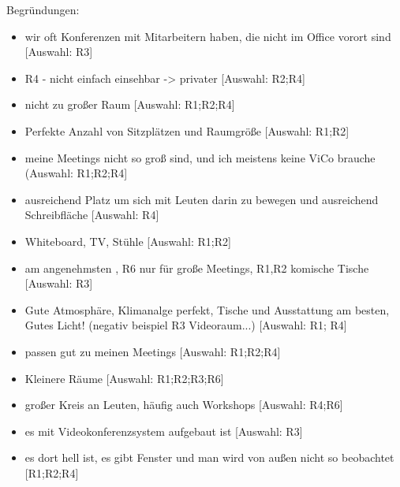 \begin{enumerate}
    Begründungen:
    \begin{itemize}
        \item wir oft Konferenzen mit Mitarbeitern haben, die nicht im Office vorort sind [Auswahl: R3]
        \item R4 - nicht einfach einsehbar -> privater [Auswahl: R2;R4]
        \item nicht zu großer Raum [Auswahl: R1;R2;R4]
        \item Perfekte Anzahl von Sitzplätzen und Raumgröße [Auswahl: R1;R2]
        \item meine Meetings nicht so groß sind, und ich meistens keine ViCo brauche (Auswahl: R1;R2;R4]
        \item ausreichend Platz um sich mit Leuten darin zu bewegen und ausreichend Schreibfläche [Auswahl: R4]
        \item Whiteboard, TV, Stühle [Auswahl: R1;R2]
        \item am angenehmsten , R6 nur für große Meetings, R1,R2 komische Tische [Auswahl: R3]
        \item Gute Atmosphäre, Klimanalge perfekt, Tische und Ausstattung am besten, Gutes Licht! (negativ beispiel R3 Videoraum...) [Auswahl: R1; R4]
        \item passen gut zu meinen Meetings [Auswahl: R1;R2;R4]
        \item Kleinere Räume [Auswahl: R1;R2;R3;R6]
        \item großer Kreis an Leuten, häufig auch Workshops [Auswahl: R4;R6]
        \item es mit Videokonferenzsystem aufgebaut ist [Auswahl: R3]
        \item es dort hell ist, es gibt Fenster und man wird von außen nicht so beobachtet [R1;R2;R4]
    \end{itemize}
    

\end{enumerate}
